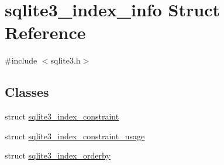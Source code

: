 \hypertarget{structsqlite3__index__info}{\section{sqlite3\-\_\-index\-\_\-info Struct Reference}
\label{structsqlite3__index__info}
}


{\ttfamily \#include $<$sqlite3.\-h$>$}

\subsection*{Classes}
\begin{DoxyCompactItemize}
\item 
struct \hyperlink{structsqlite3__index__info_1_1sqlite3__index__constraint}{sqlite3\-\_\-index\-\_\-constraint}
\item 
struct \hyperlink{structsqlite3__index__info_1_1sqlite3__index__constraint__usage}{sqlite3\-\_\-index\-\_\-constraint\-\_\-usage}
\item 
struct \hyperlink{structsqlite3__index__info_1_1sqlite3__index__orderby}{sqlite3\-\_\-index\-\_\-orderby}
\end{DoxyCompactItemize}
